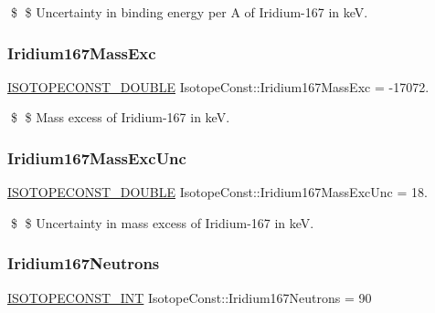 \$ \$ Uncertainty in binding energy per A of Iridium-\/167 in keV. \mbox{\label{group___isotope_const-_iridium-_ir167_ga5fb3af6896e7c957e66a4680326aa644}} 
\subsubsection{\texorpdfstring{Iridium167\+Mass\+Exc}{Iridium167MassExc}}
{\footnotesize\ttfamily \mbox{\hyperlink{group___isotope_const-_macros_ga8f45a7272ce02c0b4c65c44636ed719a}{I\+S\+O\+T\+O\+P\+E\+C\+O\+N\+S\+T\+\_\+\+D\+O\+U\+B\+LE}} Isotope\+Const\+::\+Iridium167\+Mass\+Exc = -\/17072.}

\$ \$ Mass excess of Iridium-\/167 in keV. \mbox{\label{group___isotope_const-_iridium-_ir167_gacb8a97f6d5d0db6a86f6b9941a050ae3}} 
\subsubsection{\texorpdfstring{Iridium167\+Mass\+Exc\+Unc}{Iridium167MassExcUnc}}
{\footnotesize\ttfamily \mbox{\hyperlink{group___isotope_const-_macros_ga8f45a7272ce02c0b4c65c44636ed719a}{I\+S\+O\+T\+O\+P\+E\+C\+O\+N\+S\+T\+\_\+\+D\+O\+U\+B\+LE}} Isotope\+Const\+::\+Iridium167\+Mass\+Exc\+Unc = 18.}

\$ \$ Uncertainty in mass excess of Iridium-\/167 in keV. \mbox{\label{group___isotope_const-_iridium-_ir167_gacdbac7a0147652ce9dbab3a8df6b960b}} 
\subsubsection{\texorpdfstring{Iridium167\+Neutrons}{Iridium167Neutrons}}
{\footnotesize\ttfamily \mbox{\hyperlink{group___isotope_const-_macros_ga5f18360b3e99483a35c32d789e62621c}{I\+S\+O\+T\+O\+P\+E\+C\+O\+N\+S\+T\+\_\+\+I\+NT}} Isotope\+Const\+::\+Iridium167\+Neutrons = 90}

